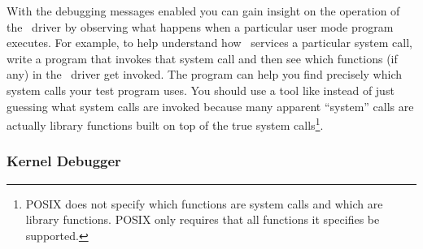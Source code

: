 With the debugging messages enabled you can gain insight on the operation of the \GenericFS\
driver by observing what happens when a particular user mode program executes. For example, to
help understand how \GenericFS\ services a particular system call, write a program that invokes
that system call and then see which functions (if any) in the \GenericFS\ driver get invoked.
The program  can help you find precisely which system calls your test program
uses. You should use a tool like \command{strace} instead of just guessing what system calls are
invoked because many apparent ``system'' calls are actually library functions built on top of
the true system calls\footnote{POSIX does not specify which functions are system calls and which
  are library functions. POSIX only requires that all functions it specifies be supported.}.

\subsubsection{Kernel Debugger}


